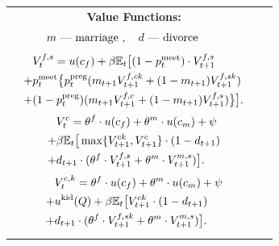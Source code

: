 \documentclass[landscape,a0paper,fontscale=0.285]{baposter} %
\begin{document}
\begin{poster}
{\begin{tabular}{c c c c}
&
\hspace{-2em}
\begin{minipage}{0.225\linewidth}
{\footnotesize
\vspace{0.3em}
\hspace{2em}\textbf{Value Functions:}
\vspace{-0.5em}
\[\hspace{-2em}m \text{ --- marriage }, \ \ \ d  \text{ --- divorce}\]
\vspace{-2em}
\begin{align*} \scriptsize
& V^{f,s}_t =  u(c_f) + \beta\mathbb{E}_t \big[(1-p^{\text{meet}}_t)\cdot V^{f,s}_{t+1}  \\ + & p^{\text{meet}}_t \big\{ p^{\text{preg}}_t (m_{t+1} V^{f,ck}_{t+1} + (1-m_{t+1})V^{f,sk}_{t+1})  
\\  +  &  (1-p^{\text{preg}}_t) (m_{t+1} V^{f,c}_{t+1} + (1-m_{t+1})V^{f,s}_{t+1})  \big\} \big].
\end{align*}
\vspace{-0.5cm}
\begin{align*} \scriptsize
& V^c_t =  \theta^f \cdot u(c_f) + \theta^m \cdot u(c_m) + \psi \\
+ & \beta\mathbb{E}_t \big[\max\{V^{ck}_{t+1},V^{c}_{t+1}\}\cdot (1-d_{t+1}) 
\\ +  & d_{t+1} \cdot(\theta^f\cdot V^{f,s}_{t+1} + \theta^m\cdot V^{m,s}_{t+1})\big].
\end{align*}
\vspace{-0.5cm}
\begin{align*} \scriptsize & V^{c,k}_t =  \theta^f \cdot u(c_f) + \theta^m \cdot u(c_m) + \psi  \\
+ & u^{\text{kid}}(Q) +  \beta\mathbb{E}_t \big[V^{ck}_{t+1}\cdot (1-d_{t+1}) 
\\ +  & d_{t+1} \cdot(\theta^f\cdot V^{f,sk}_{t+1} + \theta^m\cdot V^{m,s}_{t+1})\big].
\end{align*}
}
\end{minipage}
\end{tabular}}
\end{poster}
\end{document}
